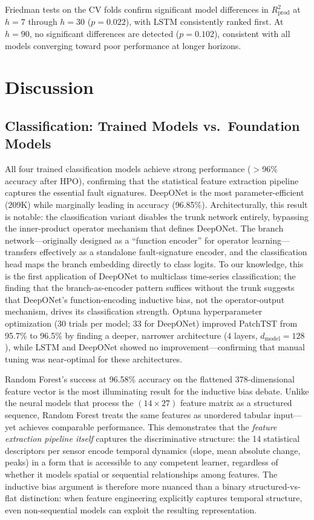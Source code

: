 \documentclass[conference]{IEEEtran}
\begin{document}
Friedman tests on the CV folds confirm significant model differences in $R^2_\text{prod}$ at $h{=}7$ through $h{=}30$ ($p{=}0.022$), with LSTM consistently ranked first. At $h{=}90$, no significant differences are detected ($p{=}0.102$), consistent with all models converging toward poor performance at longer horizons.

\section{Discussion}
\label{sec:discussion}

\subsection{Classification: Trained Models vs.\ Foundation Models}

All four trained classification models achieve strong performance ($>$96\% accuracy after HPO), confirming that the statistical feature extraction pipeline captures the essential fault signatures. DeepONet is the most parameter-efficient (209K) while marginally leading in accuracy (96.85\%). Architecturally, this result is notable: the classification variant disables the trunk network entirely, bypassing the inner-product operator mechanism that defines DeepONet. The branch network---originally designed as a ``function encoder'' for operator learning---transfers effectively as a standalone fault-signature encoder, and the classification head maps the branch embedding directly to class logits. To our knowledge, this is the first application of DeepONet to multiclass time-series classification; the finding that the branch-as-encoder pattern suffices without the trunk suggests that DeepONet's function-encoding inductive bias, not the operator-output mechanism, drives its classification strength. Optuna hyperparameter optimization (30 trials per model; 33 for DeepONet) improved PatchTST from 95.7\% to 96.5\% by finding a deeper, narrower architecture (4 layers, $d_\text{model}{=}128$), while LSTM and DeepONet showed no improvement---confirming that manual tuning was near-optimal for these architectures.

Random Forest's success at 96.58\% accuracy on the flattened 378-dimensional feature vector is the most illuminating result for the inductive bias debate. Unlike the neural models that process the $(14 \times 27)$ feature matrix as a structured sequence, Random Forest treats the same features as unordered tabular input---yet achieves comparable performance. This demonstrates that the \emph{feature extraction pipeline itself} captures the discriminative structure: the 14 statistical descriptors per sensor encode temporal dynamics (slope, mean absolute change, peaks) in a form that is accessible to any competent learner, regardless of whether it models spatial or sequential relationships among features. The inductive bias argument is therefore more nuanced than a binary structured-vs-flat distinction: when feature engineering explicitly captures temporal structure, even non-sequential models can exploit the resulting representation.
\end{document}
